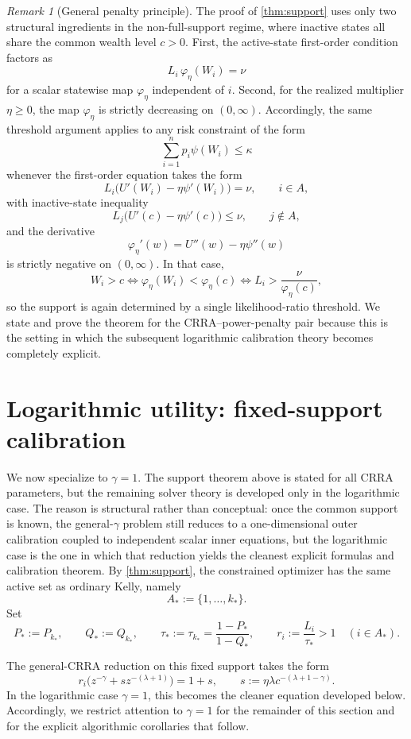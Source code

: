 \documentclass[11pt]{article}
\theoremstyle{definition}
\theoremstyle{remark}
\newtheorem{remark}[theorem]{Remark}
\newcommand{\1}{\mathbf{1}}
\begin{document}
\begin{remark}[General penalty principle]
\label{rem:general-penalty}
The proof of \cref{thm:support} uses only two structural ingredients in the non-full-support regime, where inactive states all share the common wealth level $c>0$. First, the active-state first-order condition factors as
\[
L_i\,\varphi_\eta(W_i)=\nu
\]
for a scalar statewise map $\varphi_\eta$ independent of $i$. Second, for the realized multiplier $\eta\ge 0$, the map $\varphi_\eta$ is strictly decreasing on $(0,\infty)$. Accordingly, the same threshold argument applies to any risk constraint of the form
\[
\sum_{i=1}^n p_i\psi(W_i)\le \kappa
\]
whenever the first-order equation takes the form
\[
L_i\bigl(U'(W_i)-\eta\psi'(W_i)\bigr)=\nu,
\qquad i\in A,
\]
with inactive-state inequality
\[
L_j\bigl(U'(c)-\eta\psi'(c)\bigr)\le \nu,
\qquad j\notin A,
\]
and the derivative
\[
\varphi_\eta'(w)=U''(w)-\eta\psi''(w)
\]
is strictly negative on $(0,\infty)$. In that case,
\[
W_i>c \iff \varphi_\eta(W_i)<\varphi_\eta(c)
\iff L_i>\frac{\nu}{\varphi_\eta(c)},
\]
so the support is again determined by a single likelihood-ratio threshold. We state and prove the theorem for the CRRA--power-penalty pair because this is the setting in which the subsequent logarithmic calibration theory becomes completely explicit.
\end{remark}

\section{Logarithmic utility: fixed-support calibration}
\label{sec:log}

We now specialize to $\gamma=1$. The support theorem above is stated for all CRRA parameters, but the remaining solver theory is developed only in the logarithmic case. The reason is structural rather than conceptual: once the common support is known, the general-$\gamma$ problem still reduces to a one-dimensional outer calibration coupled to independent scalar inner equations, but the logarithmic case is the one in which that reduction yields the cleanest explicit formulas and calibration theorem. By \cref{thm:support}, the constrained optimizer has the same active set as ordinary Kelly, namely
\[
A_*:=\{1,\dots,k_*\}.
\]
Set
\[
P_*:=P_{k_*},
\qquad
Q_*:=Q_{k_*},
\qquad
\tau_*:=\tau_{k_*}=\frac{1-P_*}{1-Q_*},
\qquad
r_i:=\frac{L_i}{\tau_*}>1\quad (i\in A_*).
\]

The general-CRRA reduction on this fixed support takes the form
\[
r_i\bigl(z^{-\gamma}+s z^{-(\lambda+1)}\bigr)=1+s,
\qquad
s:=\eta\lambda c^{-(\lambda+1-\gamma)}.
\]
In the logarithmic case $\gamma=1$, this becomes the cleaner equation developed below. Accordingly, we restrict attention to $\gamma=1$ for the remainder of this section and for the explicit algorithmic corollaries that follow.
\end{document}
